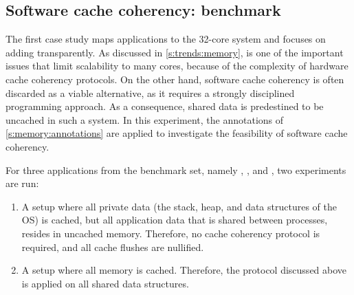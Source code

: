 \subsection{Software cache coherency: \SPLASH benchmark}
\label{s:memory:cache}

%

The first case study maps applications to the 32-core \MicroBlaze system and focuses on adding  transparently.
As discussed in \cref{s:trends:memory},  is one of the important issues that limit scalability to many cores, because of the complexity of hardware cache coherency protocols.
On the other hand, software cache coherency is often discarded as a viable alternative, as it requires a strongly disciplined programming approach.
As a consequence, shared data is predestined to be uncached in such a system.
In this experiment, the annotations of \cref{s:memory:annotations} are applied to investigate the feasibility of software cache coherency.

For three applications from the \SPLASH* benchmark set, namely , , and , two experiments are run:
\begin{enumerate}
\item A setup where all private data (the stack, heap, and data structures of the \ac{OS}) is cached, but all application data that is shared between processes, resides in uncached memory.
	Therefore, no cache coherency protocol is required, and all cache flushes are nullified.
\item A setup where all memory is cached.
	Therefore, the protocol discussed above is applied on all shared data structures.
\end{enumerate}

